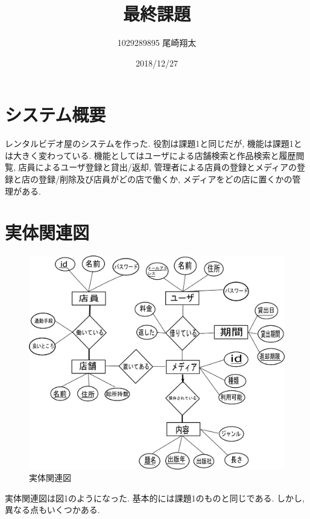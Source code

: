 \documentclass{jarticle}
\begin{document}
\title{最終課題}
\author{1029289895 尾崎翔太}
\date{2018/12/27}

\maketitle
\newpage

\section{システム概要}
レンタルビデオ屋のシステムを作った. 役割は課題1と同じだが, 機能は課題1とは大きく変わっている. 機能としてはユーザによる店舗検索と作品検索と履歴閲覧, 店員によるユーザ登録と貸出/返却, 管理者による店員の登録とメディアの登録と店の登録/削除及び店員がどの店で働くか, メディアをどの店に置くかの管理がある.

\section{実体関連図}
\begin{figure}[tp]
\begin{center}
\includegraphics[scale=0.2]{ER_final.png}
\end{center}
\caption{実体関連図}
\label{fig:er}
\end{figure}
実体関連図は図1のようになった. 基本的には課題1のものと同じである. しかし, 異なる点もいくつかある.
\end{document}
